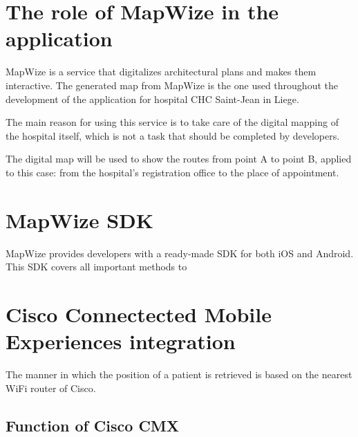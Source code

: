 \section{The role of MapWize in the application}
MapWize is a service that digitalizes architectural plans and makes them interactive.
The generated map from MapWize is the one used throughout the development of the application
for hospital CHC Saint-Jean in Liege.

The main reason for using this service is to take care of the digital mapping of the hospital itself,
which is not a task that should be completed by developers.

The digital map will be used to show the routes from point A to point B, applied to this case:
from the hospital's registration office to the place of appointment.

\section{MapWize SDK}
MapWize provides developers with a ready-made SDK for both iOS and Android. This SDK covers
all important methods to 

\section{Cisco Connectected Mobile Experiences integration}
The manner in which the position of a patient is retrieved is based on the nearest WiFi router of Cisco.
\subsection{Function of Cisco CMX}



